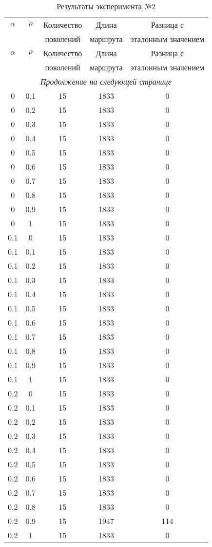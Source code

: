 \begin{longtable}{|c|c|c|c|c|}
	\caption{Результаты эксперимента №2}\label{table_2}\\
	\hline
	
	$\alpha$ & $\rho$ & Количество  & Длина & Разница с  \\
	&& поколений & маршрута & эталонным значением\\
	\hline
	\endfirsthead
	
	\hline
	$\alpha$ & $\rho$ & Количество  & Длина & Разница с  \\
	&& поколений & маршрута & эталонным значением\\
	\hline
	\endhead
	
	\hline
	\multicolumn{5}{c}{\textit{Продолжение на следующей странице}}
	\endfoot
	\hline
	\endlastfoot
	
	0& 0& 15& 1833& 0 \\
	0& 0.1& 15& 1833& 0 \\
	0& 0.2& 15& 1833& 0 \\
	0& 0.3& 15& 1833& 0 \\
	0& 0.4& 15& 1833& 0 \\
	0& 0.5& 15& 1833& 0 \\
	0& 0.6& 15& 1833& 0 \\
	0& 0.7& 15& 1833& 0 \\
	0& 0.8& 15& 1833& 0 \\
	0& 0.9& 15& 1833& 0 \\
	0& 1& 15& 1833& 0 \\
	\hline
	
	0.1& 0& 15& 1833& 0 \\
	0.1& 0.1& 15& 1833& 0 \\
	0.1& 0.2& 15& 1833& 0 \\
	0.1& 0.3& 15& 1833& 0 \\
	0.1& 0.4& 15& 1833& 0 \\
	0.1& 0.5& 15& 1833& 0 \\
	0.1& 0.6& 15& 1833& 0 \\
	0.1& 0.7& 15& 1833& 0 \\
	0.1& 0.8& 15& 1833& 0 \\
	0.1& 0.9& 15& 1833& 0 \\
	0.1& 1& 15& 1833& 0 \\
	\hline
	
	0.2& 0& 15& 1833& 0 \\
	0.2& 0.1& 15& 1833& 0 \\
	0.2& 0.2& 15& 1833& 0 \\
	0.2& 0.3& 15& 1833& 0 \\
	0.2& 0.4& 15& 1833& 0 \\
	0.2& 0.5& 15& 1833& 0 \\
	0.2& 0.6& 15& 1833& 0 \\
	0.2& 0.7& 15& 1833& 0 \\
	0.2& 0.8& 15& 1833& 0 \\
	0.2& 0.9& 15& 1947& 114 \\
	0.2& 1& 15& 1833& 0 \\
	\hline
	

\end{longtable}
